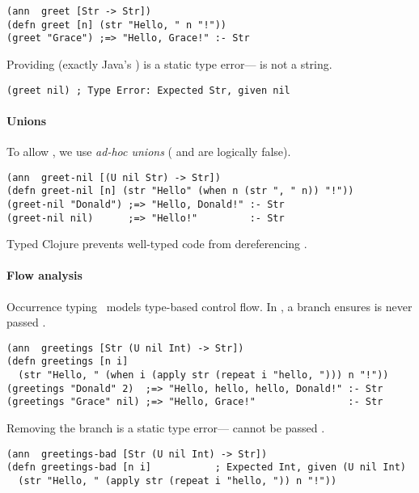 \begin{verbatim}
(ann  greet [Str -> Str])
(defn greet [n] (str "Hello, " n "!"))
(greet "Grace") ;=> "Hello, Grace!" :- Str
\end{verbatim}
%
Providing  (exactly Java's )
is a static type error--- is not a string.
%
\begin{verbatim}
(greet nil) ; Type Error: Expected Str, given nil
\end{verbatim}

\paragraph{Unions} To allow , we use \emph{ad-hoc unions} ( and 
are logically false).
%
\begin{verbatim}
(ann  greet-nil [(U nil Str) -> Str])
(defn greet-nil [n] (str "Hello" (when n (str ", " n)) "!"))
(greet-nil "Donald") ;=> "Hello, Donald!" :- Str 
(greet-nil nil)      ;=> "Hello!"         :- Str
\end{verbatim}
%
%
Typed Clojure prevents well-typed code from dereferencing .

\paragraph{Flow analysis} Occurrence typing~\cite{TF10}
models type-based control flow.
In , a branch ensures 
is never passed .
%
\begin{verbatim}
(ann  greetings [Str (U nil Int) -> Str])
(defn greetings [n i]
  (str "Hello, " (when i (apply str (repeat i "hello, "))) n "!"))
(greetings "Donald" 2)  ;=> "Hello, hello, hello, Donald!" :- Str
(greetings "Grace" nil) ;=> "Hello, Grace!"                :- Str
\end{verbatim}
%
Removing the branch is a static type error--- cannot be passed .
%
\begin{verbatim}
(ann  greetings-bad [Str (U nil Int) -> Str])
(defn greetings-bad [n i]           ; Expected Int, given (U nil Int)
  (str "Hello, " (apply str (repeat i "hello, ")) n "!"))
\end{verbatim}


